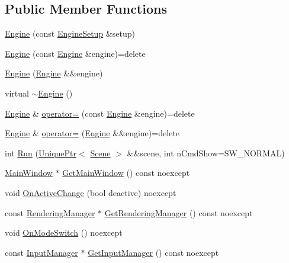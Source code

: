 \subsection*{Public Member Functions}
\begin{DoxyCompactItemize}
\item 
\hyperlink{classmage_1_1_engine_a99770cbb017b29c284d7f8e4c7e2b84c}{Engine} (const \hyperlink{structmage_1_1_engine_setup}{Engine\+Setup} \&setup)
\item 
\hyperlink{classmage_1_1_engine_afd2f4f32b2e803f59521aafe1924f0ba}{Engine} (const \hyperlink{classmage_1_1_engine}{Engine} \&engine)=delete
\item 
\hyperlink{classmage_1_1_engine_a69ee5a698bf54da107ebaa7839812840}{Engine} (\hyperlink{classmage_1_1_engine}{Engine} \&\&engine)
\item 
virtual \hyperlink{classmage_1_1_engine_a34628556f8397d70ed018d71e343c2f5}{$\sim$\+Engine} ()
\item 
\hyperlink{classmage_1_1_engine}{Engine} \& \hyperlink{classmage_1_1_engine_a1eedff82d4c8207c61676230520648fd}{operator=} (const \hyperlink{classmage_1_1_engine}{Engine} \&engine)=delete
\item 
\hyperlink{classmage_1_1_engine}{Engine} \& \hyperlink{classmage_1_1_engine_a22607a263e0be5e179cc0e4bf13b18f7}{operator=} (\hyperlink{classmage_1_1_engine}{Engine} \&\&engine)=delete
\item 
int \hyperlink{classmage_1_1_engine_a4ad554bca1ac892e1274f2e707c2a017}{Run} (\hyperlink{namespacemage_a3316d7143a973e37adf1110f2e80ca31}{Unique\+Ptr}$<$ \hyperlink{classmage_1_1_scene}{Scene} $>$ \&\&scene, int n\+Cmd\+Show=S\+W\+\_\+\+N\+O\+R\+M\+AL)
\item 
\hyperlink{classmage_1_1_main_window}{Main\+Window} $\ast$ \hyperlink{classmage_1_1_engine_a56e7cbf3a781bd519ed79f0a75a9ce86}{Get\+Main\+Window} () const noexcept
\item 
void \hyperlink{classmage_1_1_engine_afd52a8088d6d37605cb352028098c508}{On\+Active\+Change} (bool deactive) noexcept
\item 
const \hyperlink{classmage_1_1_rendering_manager}{Rendering\+Manager} $\ast$ \hyperlink{classmage_1_1_engine_ae3d894eacf94cdf416d95c57e45b4836}{Get\+Rendering\+Manager} () const noexcept
\item 
void \hyperlink{classmage_1_1_engine_a6ac289fd093967c370955810e26d251f}{On\+Mode\+Switch} () noexcept
\item 
const \hyperlink{classmage_1_1_input_manager}{Input\+Manager} $\ast$ \hyperlink{classmage_1_1_engine_a9e8de859024c2b51d9b20ce498d6c07b}{Get\+Input\+Manager} () const noexcept

\end{DoxyCompactItemize}

